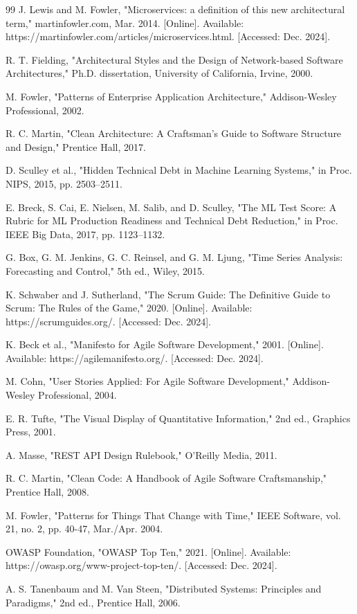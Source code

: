 \begin{thebibliography}{99}
J. Lewis and M. Fowler, "Microservices: a definition of this new architectural term," martinfowler.com, Mar. 2014. [Online]. Available: https://martinfowler.com/articles/microservices.html. [Accessed: Dec. 2024].

R. T. Fielding, "Architectural Styles and the Design of Network-based Software Architectures," Ph.D. dissertation, University of California, Irvine, 2000.

M. Fowler, "Patterns of Enterprise Application Architecture," Addison-Wesley Professional, 2002.

R. C. Martin, "Clean Architecture: A Craftsman's Guide to Software Structure and Design," Prentice Hall, 2017.

D. Sculley et al., "Hidden Technical Debt in Machine Learning Systems," in Proc. NIPS, 2015, pp. 2503–2511.

E. Breck, S. Cai, E. Nielsen, M. Salib, and D. Sculley, "The ML Test Score: A Rubric for ML Production Readiness and Technical Debt Reduction," in Proc. IEEE Big Data, 2017, pp. 1123–1132.

G. Box, G. M. Jenkins, G. C. Reinsel, and G. M. Ljung, "Time Series Analysis: Forecasting and Control," 5th ed., Wiley, 2015.

K. Schwaber and J. Sutherland, "The Scrum Guide: The Definitive Guide to Scrum: The Rules of the Game," 2020. [Online]. Available: https://scrumguides.org/. [Accessed: Dec. 2024].

K. Beck et al., "Manifesto for Agile Software Development," 2001. [Online]. Available: https://agilemanifesto.org/. [Accessed: Dec. 2024].

M. Cohn, "User Stories Applied: For Agile Software Development," Addison-Wesley Professional, 2004.

E. R. Tufte, "The Visual Display of Quantitative Information," 2nd ed., Graphics Press, 2001.

A. Masse, "REST API Design Rulebook," O'Reilly Media, 2011.

R. C. Martin, "Clean Code: A Handbook of Agile Software Craftsmanship," Prentice Hall, 2008.

M. Fowler, "Patterns for Things That Change with Time," IEEE Software, vol. 21, no. 2, pp. 40-47, Mar./Apr. 2004.

OWASP Foundation, "OWASP Top Ten," 2021. [Online]. Available: https://owasp.org/www-project-top-ten/. [Accessed: Dec. 2024].

A. S. Tanenbaum and M. Van Steen, "Distributed Systems: Principles and Paradigms," 2nd ed., Prentice Hall, 2006.

\end{thebibliography}